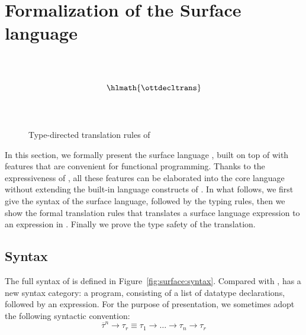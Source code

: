 \section{Formalization of the Surface language}
\label{sec:surface}

\begin{figure*}
\small
\centering
\renewcommand{\ottinterrule}{\\}
\renewcommand{\ottdrule}[4][]{{\inferrule{#2 }{#3}\,\ottdrulename{#4}}}
\renewenvironment{ottdefnblock}[3][]{\raggedright \framebox{\mbox{#2}} \quad #3 \\[0pt]}{}
\renewcommand{\ottusedrule}[1]{$#1\quad$}
\ottdefnctxtrans{}\ottinterrule
\ottdefnpgmtrans{}\ottinterrule
\ottdefndecltrans{}
\[\hlmath{\ottdecltrans}\]\ottinterrule %
\ottdefnpattrans{}\ottinterrule
\setlength{\lineskip}{1pt}
\ottdefnexprtrans{}
\caption{Type-directed translation rules of \sufcc}
\label{fig:source:translate}
\end{figure*}


In this section, we formally present the surface language \sufcc,
built on top of \name with features that are convenient for functional
programming. Thanks to the expressiveness of \name, all these features
can be elaborated into the core language without extending the
built-in language constructs of \name. In what follows, we first give
the syntax of the surface language, followed by the typing rules, then
we show the formal translation rules that translates a surface
language expression to an expression in \name. Finally we prove the
type safety of the translation.

\subsection{Syntax}

The full syntax of \sufcc is defined in
Figure~\ref{fig:surface:syntax}. Compared with \name, \sufcc has a new
syntax category: a program, consisting of a list of datatype
declarations, followed by an expression. For the purpose of
presentation, we sometimes adopt the following syntactic convention:
\[
\overline{\tau}^n \rightarrow \tau_r \equiv \tau_1 \rightarrow \dots \rightarrow \tau_n \rightarrow \tau_r
\]

